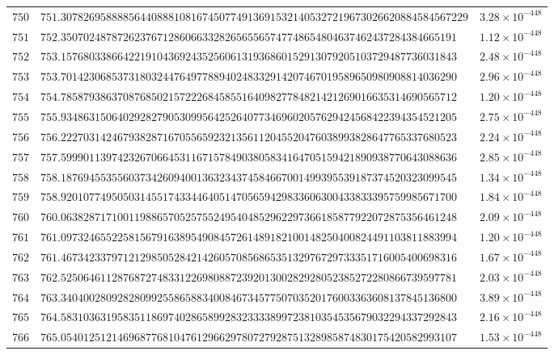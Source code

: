 \documentclass[12pt,reqno]{amsart}
\theoremstyle{remark}
\begin{document}
\begin{longtable}{clc}
$750$ & $751.307826958888564408881081674507749136915321405327219673026620884584567229$ & $3.28\times 10^{-448}$ \\
$751$ & $752.3507024878726237671286066332826565565747748654804637462437284384665191$ & $1.12\times 10^{-448}$ \\
$752$ & $753.1576803386642219104369243525606131936860152913079205103729487736031843$ & $2.48\times 10^{-448}$ \\
$753$ & $753.7014230685373180324476497788940248332914207467019589650980908814036290$ & $2.96\times 10^{-448}$ \\
$754$ & $754.7858793863708768502157222684585516409827784821421269016635314690565712$ & $1.20\times 10^{-448}$ \\
$755$ & $755.9348631506402928279053099564252640773469602057629424568422394354521205$ & $2.75\times 10^{-448}$ \\
$756$ & $756.2227031424679382871670556592321356112045520476038993828647765337680523$ & $2.24\times 10^{-448}$ \\
$757$ & $757.5999011397423267066453116715784903805834164705159421890938770643088636$ & $2.85\times 10^{-448}$ \\
$758$ & $758.1876945535560373426094001363234374584667001499395539187374520323099545$ & $1.34\times 10^{-448}$ \\
$759$ & $758.9201077495050314551743344640514705659429833606300433833395759985671700$ & $1.84\times 10^{-448}$ \\
$760$ & $760.0638287171001198865705257552495404852962297366185877922072875356461248$ & $2.09\times 10^{-448}$ \\
$761$ & $761.0973246552258156791638954908457261489182100148250400824491103811883994$ & $1.20\times 10^{-448}$ \\
$762$ & $761.4673423379712129850528421426057085686535132976729733351716005400698316$ & $1.67\times 10^{-448}$ \\
$763$ & $762.5250646112876872748331226980887239201300282928052385272280866739597781$ & $2.03\times 10^{-448}$ \\
$764$ & $763.3404002809282809925586588340084673457750703520176003363608137845136800$ & $3.89\times 10^{-448}$ \\
$765$ & $764.5831036319583511869740286589928323333899723810354535679032294337292843$ & $2.16\times 10^{-448}$ \\
$766$ & $765.0540125121469687768104761296629780727928751328985874830175420582993107$ & $1.53\times 10^{-448}$ \\

\end{longtable}
\end{document}

